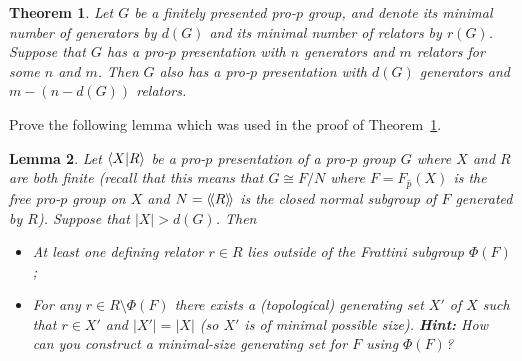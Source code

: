 \documentclass[12pt]{amsart}
\newtheorem {Theorem}    {Theorem}
\newtheorem {Lemma} [Theorem]   {Lemma}
\begin{document}
\begin{Theorem} 
\label{thm:relator}
Let $G$ be a finitely presented pro-$p$ group, and denote its minimal number of generators by $d(G)$ and its minimal number of relators by $r(G)$. Suppose that $G$ has a pro-$p$ presentation with $n$ generators and $m$ relators for some $n$ and $m$. Then $G$ also has a pro-$p$ presentation with $d(G)$ generators and $m-(n-d(G))$ relators.
\end{Theorem}
Prove the following lemma which was used in the proof of Theorem~\ref{thm:relator}.
\begin{Lemma}
\label{lem:relator}
Let ${\langle} X|R{\rangle}$ be a pro-$p$ presentation of a pro-$p$ group $G$ where $X$ and $R$ are both finite (recall that this means that $G\cong F/N$ where $F=F_{\widehat p}(X)$ is the free pro-$p$ group on $X$ and $N={\langle}\!{\langle} R{\rangle}\!{\rangle}$
is the closed normal subgroup of $F$ generated by $R$). Suppose that $|X|>d(G)$. Then
\begin{itemize}
\item[(a)] At least one defining relator $r\in R$ lies outside of the Frattini subgroup $\Phi(F)$;
\item[(b)] For any $r\in R\setminus \Phi(F)$ there exists a (topological) generating set $X'$ of $X$
such that $r\in X'$ and $|X'|=|X|$ (so $X'$ is of minimal possible size). {\bf Hint:} How can you construct a minimal-size generating set for $F$ using $\Phi(F)$?  
\end{itemize}
\end{Lemma}
\skv
\end{document}
